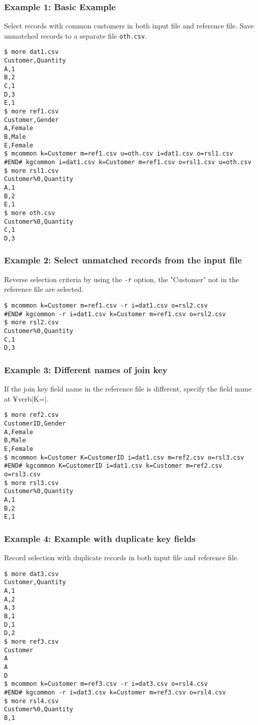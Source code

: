 \subsubsection*{Example 1: Basic Example}

Select records with common customers in both input file and reference file. Save unmatched records to a separate file \verb|oth.csv|.


\begin{Verbatim}[baselinestretch=0.7,frame=single]
$ more dat1.csv
Customer,Quantity
A,1
B,2
C,1
D,3
E,1
$ more ref1.csv
Customer,Gender
A,Female
B,Male
E,Female
$ mcommon k=Customer m=ref1.csv u=oth.csv i=dat1.csv o=rsl1.csv
#END# kgcommon i=dat1.csv k=Customer m=ref1.csv o=rsl1.csv u=oth.csv
$ more rsl1.csv
Customer%0,Quantity
A,1
B,2
E,1
$ more oth.csv
Customer%0,Quantity
C,1
D,3
\end{Verbatim}
\subsubsection*{Example 2: Select unmatched records from the input file}

Reverse selection criteria by using the \verb|-r| option, the "Customer" not in the reference file are selected.


\begin{Verbatim}[baselinestretch=0.7,frame=single]
$ mcommon k=Customer m=ref1.csv -r i=dat1.csv o=rsl2.csv
#END# kgcommon -r i=dat1.csv k=Customer m=ref1.csv o=rsl2.csv
$ more rsl2.csv
Customer%0,Quantity
C,1
D,3
\end{Verbatim}
\subsubsection*{Example 3: Different names of join key}

If the join key field name in the reference file is different, specify the field name at ¥verb|K=|.


\begin{Verbatim}[baselinestretch=0.7,frame=single]
$ more ref2.csv
CustomerID,Gender
A,Female
B,Male
E,Female
$ mcommon k=Customer K=CustomerID i=dat1.csv m=ref2.csv o=rsl3.csv
#END# kgcommon K=CustomerID i=dat1.csv k=Customer m=ref2.csv o=rsl3.csv
$ more rsl3.csv
Customer%0,Quantity
A,1
B,2
E,1
\end{Verbatim}
\subsubsection*{Example 4: Example with duplicate key fields}

Record selection with duplicate records in both input file and reference file.


\begin{Verbatim}[baselinestretch=0.7,frame=single]
$ more dat3.csv
Customer,Quantity 
A,1
A,2
A,3
B,1
D,1
D,2
$ more ref3.csv
Customer
A
A
D
$ mcommon k=Customer m=ref3.csv -r i=dat3.csv o=rsl4.csv
#END# kgcommon -r i=dat3.csv k=Customer m=ref3.csv o=rsl4.csv
$ more rsl4.csv
Customer%0,Quantity 
B,1
\end{Verbatim}
